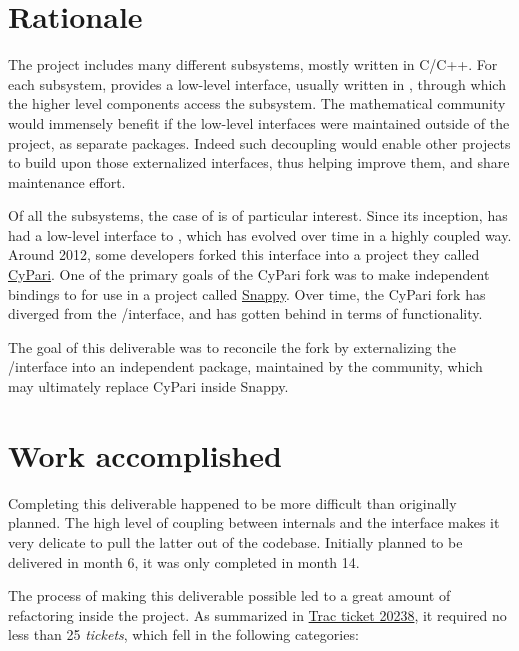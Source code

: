 \documentclass{deliverablereport}
\author{Luca De Feo and Jeroen Demeyer}
\begin{document}
\enlargethispage{4ex}
\maketitle
\githubissuedescription
\tableofcontents\newpage


\section{Rationale}

The \Sage project includes many different subsystems, mostly written
in C/C++. For each subsystem, \Sage provides a low-level interface,
usually written in \Cython, through which the higher level components
access the subsystem. The mathematical community would immensely
benefit if the low-level interfaces were maintained outside of the
\Sage project, as separate \Python packages. Indeed such decoupling
would enable other \Python projects to build upon those externalized
interfaces, thus helping improve them, and share maintenance effort.

Of all the subsystems, the case of \Pari is of particular
interest. Since its inception, \Sage has had a low-level \Cython
interface to \Pari, which has evolved over time in a highly coupled
way. Around 2012, some \Sage developers forked this interface into a
project they called
\href{https://bitbucket.org/t3m/cypari/}{CyPari}. One of the primary
goals of the CyPari fork was to make independent \Python bindings to
\Pari for use in a project called
\href{https://bitbucket.org/t3m/snappy}{Snappy}. Over time, the CyPari
fork has diverged from the \Sage/\Pari interface, and has gotten
behind in terms of functionality.

The goal of this deliverable was to reconcile the fork by
externalizing the \Sage/\Pari interface into an independent package,
maintained by the \Sage community, which may ultimately replace CyPari
inside Snappy. 


\section{Work accomplished}

Completing this deliverable happened to be more difficult than
originally planned. The high level of coupling between \Sage internals
and the \Pari interface makes it very delicate to pull the latter out
of the \Sage codebase. Initially planned to be delivered in month 6,
it was only completed in month 14.

The process of making this deliverable possible led to a great amount
of refactoring inside the \Sage project. As summarized in
\href{http://trac.sagemath.org/ticket/20238}{Trac ticket 20238}, it
required no less than 25 \emph{tickets}, which fell in the following
categories:
\end{document}
